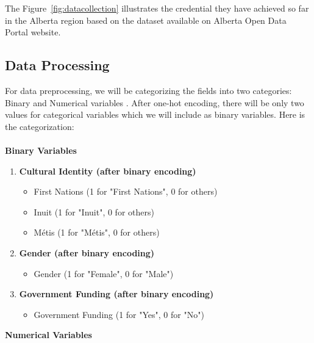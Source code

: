 \documentclass[conference]{IEEEtran}
\begin{document}
The Figure~\ref{fig:datacollection} illustrates the credential they have achieved so far in the Alberta region based on the dataset available on Alberta Open Data Portal website.


\subsection{\textbf{Data Processing}}
For data preprocessing, we will be categorizing the fields into two categories:
Binary and Numerical variables \cite{r16}. After one-hot encoding, there will be
only two values for categorical variables which we will include as binary
variables. Here is the categorization:
\\
\\\textbf{Binary Variables}
\begin{enumerate}[itemsep=0pt, parsep=0pt, topsep=0pt, partopsep=0pt]
    \item \textbf{Cultural Identity (after binary encoding)}  
\begin{itemize}[itemsep=0pt, parsep=0pt, topsep=0pt, partopsep=0pt]
  \item First Nations (1 for "First Nations", 0 for others)
  \item Inuit (1 for "Inuit", 0 for others)
  \item Métis (1 for "Métis", 0 for others)
\end{itemize}

    \item \textbf{Gender (after binary encoding)}  
\begin{itemize}[itemsep=0pt, parsep=0pt, topsep=0pt, partopsep=0pt]
  \item Gender (1 for "Female", 0 for "Male") 
\end{itemize}

    \item \textbf{Government Funding (after binary encoding)}  
\begin{itemize}[itemsep=0pt, parsep=0pt, topsep=0pt, partopsep=0pt]
  \item Government Funding (1 for "Yes", 0 for "No")
\end{itemize}
\end{enumerate}
\textbf{Numerical Variables}
\end{document}
